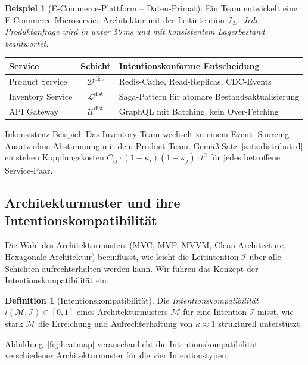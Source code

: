 ﻿\documentclass[a4paper,12pt]{article}
\theoremstyle{definition}
\newtheorem{definition}{Definition}
\newtheorem{beispiel}{Beispiel}
\begin{document}
\begin{beispiel}[E-Commerce-Plattform -- Daten-Primat]\label{bsp:ecommerce}
Ein Team entwickelt eine E-Commerce-Microservice-Architektur mit der
Leitintention $\mathcal{I}_D$: \textit{\glqq{}Jede Produktanfrage wird in
unter 50\,ms und mit konsistentem Lagerbestand beantwortet.\grqq{}}

\begin{center}
\begin{tabular}{lcp{5cm}}
\toprule
Service & Schicht & Intentionskonforme Entscheidung \\
\midrule
Product Service & $\mathcal{D}^{\text{dist}}$ & Redis-Cache, Read-Replicas,
CDC-Events \\
Inventory Service & $\mathcal{L}^{\text{dist}}$ & Saga-Pattern für
atomare Bestandsaktualisierung \\
API Gateway & $\mathcal{U}^{\text{dist}}$ & GraphQL mit Batching,
kein Over-Fetching \\
\bottomrule
\end{tabular}
\end{center}

Inkonsistenz-Beispiel: Das Inventory-Team wechselt zu einem Event-
Sourcing-Ansatz ohne Abstimmung mit dem Product-Team. Gemäß
Satz~\ref{satz:distributed} entstehen Kopplungskosten $C_{ij} \cdot
(1-\kappa_i)(1-\kappa_j) \cdot t^2$ für jedes betroffene Service-Paar.
\end{beispiel}

\subsection{Architekturmuster und ihre Intentionskompatibilität}

Die Wahl des Architekturmusters (MVC, MVP, MVVM, Clean Architecture,
Hexagonale Architektur) beeinflusst, wie leicht die Leitintention
$\mathcal{I}$ über alle Schichten aufrechterhalten werden kann. Wir
führen das Konzept der Intentionskompatibilität ein.

\begin{definition}[Intentionskompatibilität]
Die \emph{Intentionskompatibilität} $\iota(\mathcal{M}, \mathcal{I}) \in [0,1]$
eines Architekturmusters $\mathcal{M}$ für eine Intention $\mathcal{I}$
misst, wie stark $\mathcal{M}$ die Erreichung und Aufrechterhaltung von
$\kappa \approx 1$ strukturell unterstützt.
\end{definition}

Abbildung~\ref{fig:heatmap} veranschaulicht die Intentionskompatibilität
verschiedener Architekturmuster für die vier Intentionstypen.
\end{document}
